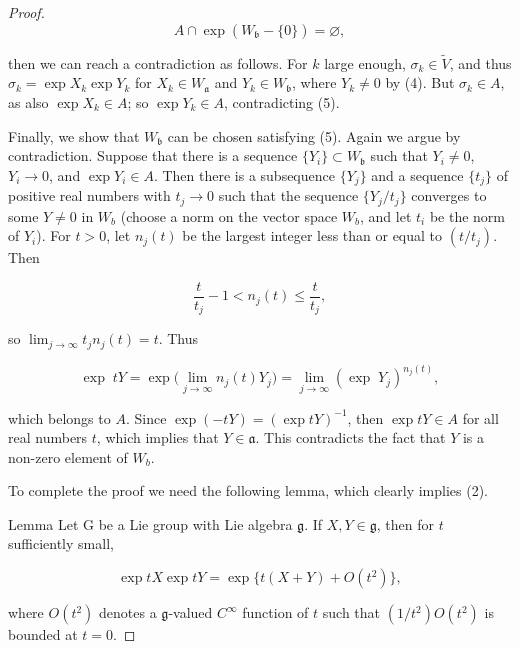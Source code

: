\begin{proof}
\begin{equation}
\tag{5}\label{eq:3.42:5}
A\cap\exp(W_{\mathfrak{b}}-\{0\})=\varnothing,
\end{equation}

then we can reach a contradiction as follows. For $k$ large enough, $\sigma_k \in \tilde{V}$, and thus $\sigma_k = \exp X_k \exp Y_k$ for $X_k\in W_{\mathfrak{a}}$ and $Y_k\in W_{\mathfrak{b}}$, where $Y_k \neq 0$ by (4). But $\sigma_k \in A$, as also $\exp X_k \in A$; so $\exp Y_k \in A$, contradicting (5).

Finally, we show that $W_{\mathfrak{b}}$ can be chosen satisfying (5). Again we argue by contradiction. Suppose that there is a sequence $\{Y_i\}\subset W_{\mathfrak{b}}$ such that $Y_i \neq 0$, $Y_i \to 0$, and $\exp Y_i \in A$. Then there is a subsequence $\{Y_j\}$ and a sequence $\{t_j\}$ of positive real numbers with $t_j \to 0$ such that the sequence $\{Y_j/t_j\}$ converges to some $Y \neq 0$ in $W_b$ (choose a norm on the vector space $W_b$, and let $t_i$ be the norm of $Y_i$). For $t > 0$, let $n_j(t)$ be the largest integer less than or equal to $(t/t_j)$. Then

\[
\frac{t}{t_{j}}-1<n_{j}(t)\leq\frac{t}{t_{j}},
\]

so  $ \lim_{j \to \infty} t_j n_j(t) = t $. Thus

\[
\exp\;t Y=\exp\biggl(\lim_{j\to\infty}n_{j}(t)Y_{j}\biggr)=\lim_{j\to\infty}(\exp\;Y_{j})^{n_{j}(t)},
\]

which belongs to $A$. Since $\exp(-tY) = (\exp{tY})^{-1}$, then $\exp{tY} \in A$ for all real numbers $t$, which implies that $Y\in\mathfrak{a}$. This contradicts the fact that $Y$ is a non-zero element of $W_b$.

To complete the proof we need the following lemma, which clearly implies (2).

Lemma Let G be a Lie group with Lie algebra $\mathfrak{g}$. If $X, Y \in \mathfrak{g}$, then for $t$ sufficiently small,

\begin{equation}
\tag{6}\label{eq:3.42:6}
\exp tX\exp tY=\exp\{t(X+Y)+O(t^{2})\},
\end{equation}

where $O(t^{2})$ denotes a $\mathfrak{g}$-valued $C^{\infty}$ function of $t$ such that $(1/t^{2})O(t^{2})$ is bounded at $t=0$.

\end{proof}

